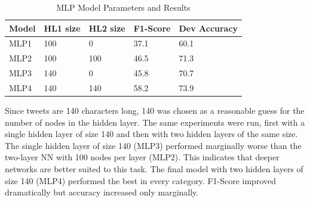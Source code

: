 \documentclass[11pt,a4paper]{article}
\begin{document}
\begin{table}[htp]
	\centering
	\caption{MLP Model Parameters and Results}
	\label{my-label}
	\hspace{-1.6cm}
	\begin{tabular}{@{}lllll@{}}
		\toprule
		Model       & HL1 size & HL2 size & F1-Score & Dev Accuracy \\ \midrule
		MLP1 		& 100     & 0  &     37.1 & 60.1  \\
		MLP2        & 100     & 100    &   46.5 & 71.3 \\
		MLP3     	& 140     & 0   &     45.8 & 70.7    \\
		MLP4        & 140     & 140    &   58.2 & 73.9  \\ \bottomrule

	\end{tabular}
\end{table} 
Since tweets are 140 characters long, 140 was chosen as a reasonable guess for the number of nodes in the hidden layer. The same experiments were run, first with a single hidden layer of size 140 and then with two hidden layers of the same size. The single hidden layer of size 140 (MLP3) performed marginally worse than the two-layer NN with 100 nodes per layer (MLP2). This indicates that deeper networks are better suited to this task. The final model with two hidden layers of size 140 (MLP4) performed the best in every category. F1-Score improved dramatically but accuracy increased only marginally.
\end{document}
